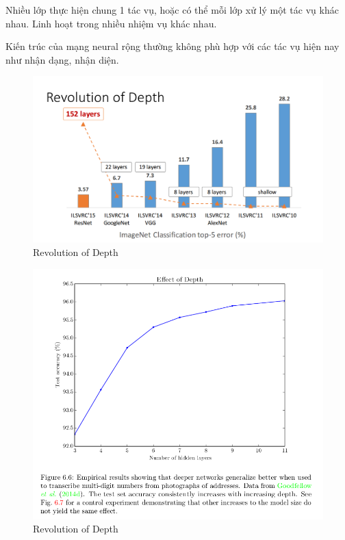 \documentclass{article}
\begin{document}
	Nhiều lớp thực hiện chung 1 tác vụ, hoặc có thể mỗi lớp xử lý một tác vụ khác nhau. Linh hoạt trong nhiều nhiệm vụ khác nhau.
	
	Kiến trúc của mạng neural rộng thường không phù hợp với các tác vụ hiện nay như nhận dạng, nhận diện.
	
	\begin{figure}[H]
		\centering
		\includegraphics[width=1\linewidth]{images/a5_1.png}
		\caption{Revolution of Depth}
		\label{fig:writing-thesis}
	\end{figure}

	\begin{figure}[H]
		\centering
		\includegraphics[width=1\linewidth]{images/a5_2.png}
		\caption{Revolution of Depth}
		\label{fig:writing-thesis}
	\end{figure}
	
\end{document}
